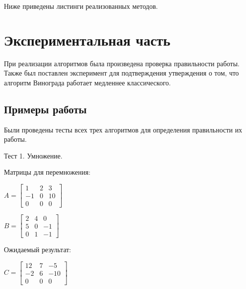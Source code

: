 \documentclass[12pt,a4paper]{scrartcl}
\begin{document}
Ниже приведены листинги реализованных методов.


 
\section{Экспериментальная часть}
\label{sec:exp}

При реализации алгоритмов была произведена проверка правильности работы. 
Также был поставлен эксперимент для подтверждения утверждения о том, что алгоритм Винограда работает медленнее классического.

\subsection{Примеры работы}
\label{sec:exp:examples}

Были проведены тесты всех трех алгоритмов для определения правильности их работы.

Тест 1. Умножение.

Матрицы для перемножения:

\begin{minipage}[c][3cm][c]{0,5\textwidth}
	\begin{math}\label{eq:test11}
	A =\begin{bmatrix}
	1 & 2 & 3\\
	-1 & 0 & 10\\
	0 & 0 & 0
	\end{bmatrix}
	\end{math}
\end{minipage}
\begin{minipage}[c][3cm][c]{0,5\textwidth}
	\begin{math}\label{eq:test12}
	B =\begin{bmatrix}
	2 & 4 & 0\\
	5 & 0 & -1\\
	0 & 1 & -1
	\end{bmatrix}
	\end{math}
\end{minipage}

Ожидаемый результат:

\begin{center}
		\begin{math}\label{eq:res1}
		C =\begin{bmatrix}
		12 & 7 & -5\\
		-2 & 6 & -10\\
		0 & 0 & 0
		\end{bmatrix}
		\end{math}
\end{center}
\end{document}
